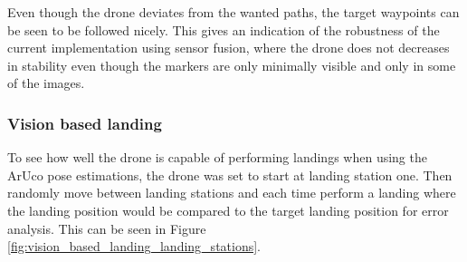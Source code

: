 \documentclass[../Head/report.tex]{subfiles}
\begin{document}
Even though the drone deviates from the wanted paths, the target waypoints can be seen to be followed nicely. This gives an indication of the robustness of the current implementation using sensor fusion, where the drone does not decreases in stability even though the markers are only minimally visible and only in some of the images.   

\subsubsection{Vision based landing}
\label{sec:vision_based_landing}

To see how well the drone is capable of performing landings when using the ArUco pose estimations, the drone was set to start at landing station one. Then randomly move between landing stations and each time perform a landing where the landing position would be compared to the target landing position for error analysis. This can be seen in Figure \ref{fig:vision_based_landing_landing_stations}.  
\end{document}
